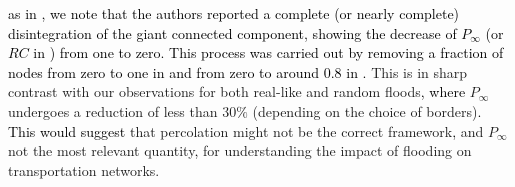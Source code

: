 \documentclass[twocolumn,fleqn,10pt]{wlscirep}
\begin{document}
\textcolor{black}{as in 
\cite{Abdulla2021,Dong2020a,Farahmand2020,Wang2019},
we note that the authors reported a complete (or nearly complete) disintegration of the giant connected component, showing the decrease of $P_\infty$ (or $RC$ in \cite{Dong2020a}) from one to zero. This process was carried out by removing a fraction of nodes from zero to one in \cite{Abdulla2021,Dong2020a,Farahmand2020} and from zero to around $0.8$ in \cite{Wang2019}.}
This is in sharp contrast with our observations for both real-like and random floods\textcolor{black}{, where} $P_\infty$ undergoes a reduction of less than $30\%$ (depending on the choice of borders)\textcolor{black}{. This would suggest} that percolation might not be the correct framework\textcolor{black}{,} and $P_\infty$ not the most relevant quantity\textcolor{black}{,} for understanding the impact of flooding on transportation networks.
\end{document}
